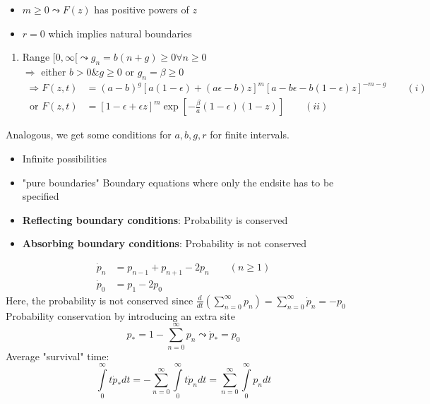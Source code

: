 \begin{itemize}[label={$\leadsto$}]
	\item $m\geq 0\leadsto F(z)$ has positive powers of $z$
	\item $r=0$ which implies natural boundaries
\end{itemize}
\begin{enumerate}[label={case $(\roman*):$}]
	\item Range $[0,\infty[\leadsto g_n=b(n+g)\geq 0\forall n\geq 0$\\
		$\Rightarrow$ either $b>0\& g\geq 0$ or $g_n=\beta\geq 0$
		\begin{align*}
			\Rightarrow F(z,t)&=(a-b)^g\left[a(1-\epsilon)+(a\epsilon -b)z\right]^m\left[a-b\epsilon -b(1-\epsilon)z\right]^{-m-g}\qquad (i)\\
			\text{ or } F(z,t)&=\left[1-\epsilon +\epsilon z\right]^m\exp\left[-\frac{\beta}{a}(1-\epsilon)(1-z)\right] \qquad (ii)
		\end{align*}
\end{enumerate}
Analogous, we get some conditions for $a,b,g,r$ for finite intervals.\\
\textbf{\underline{}}
\begin{itemize}[label={$\cdot$}]
	\item Infinite possibilities
	\item "pure boundaries" Boundary equations where only the endsite has to be specified
	\item \textbf{Reflecting boundary conditions}: Probability is conserved
	\item \textbf{Absorbing boundary conditions}: Probability is not conserved
\end{itemize}
\underline{}
\begin{align*}
	\dot{p}_n&=p_{n-1}+p_{n+1}-2p_n\qquad (n\geq 1)\\
	\dot{p}_0&=p_1-2p_0
\end{align*}
Here, the probability is not conserved since $\frac{d}{dt}\left(\sum\limits_{n=0}^\infty p_n\right)=\sum\limits_{n=0}^\infty\dot{p}_n=-p_0$\\
Probability conservation by introducing an extra site
\begin{equation*}
	p_\ast=1-\sum\limits_{n=0}^\infty p_n \leadsto \dot{p}_\ast=p_0
\end{equation*}
Average "survival" time:
\begin{equation*}
	\int\limits_0^\infty t\dot{p}_\ast dt=-\sum\limits_{n=0}^\infty\int\limits_0^\infty t\dot{p}_ndt=\sum\limits_{n=0}^\infty\int\limits_0^\infty p_n dt
\end{equation*}
